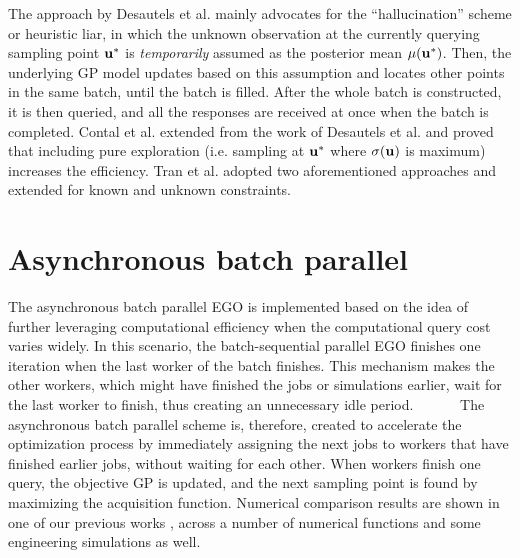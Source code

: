 The approach by Desautels et al. \cite{desautels2014parallelizing} mainly advocates for the ``hallucination'' scheme or heuristic liar, in which the unknown observation at the currently querying sampling point ${\bf u}^*$ is \emph{temporarily} assumed as the posterior mean $\mu({\bf u}^*)$. 
Then, the underlying GP model updates based on this assumption and locates other points in the same batch, until the batch is filled. 
After the whole batch is constructed, it is then queried, and all the responses are received at once when the batch is completed. 
Contal et al. \cite{contal2013parallel} extended from the work of Desautels et al. \cite{desautels2014parallelizing} and proved that including pure exploration (i.e. sampling at ${\bf u}^*$ where $\sigma({\bf u})$ is maximum) increases the efficiency. Tran et al. \cite{tran2019pbo} adopted two aforementioned approaches and extended for known and unknown constraints. 

\section{Asynchronous batch parallel}

The asynchronous batch parallel EGO is implemented based on the idea of further leveraging computational efficiency when the computational query cost varies widely.
In this scenario, the batch-sequential parallel EGO finishes one iteration when the last worker of the batch finishes.
This mechanism makes the other workers, which might have finished the jobs or simulations earlier, wait for the last worker to finish, thus creating an unnecessary idle period.        
The asynchronous batch parallel scheme is, therefore, created to accelerate the optimization process by immediately assigning the next jobs to workers that have finished earlier jobs, without waiting for each other.
When workers finish one query, the objective GP is updated, and the next sampling point is found by maximizing the acquisition function. 
Numerical comparison results are shown in one of our previous works \cite{tran2022aphbo}, across a number of numerical functions and some engineering simulations as well. 



